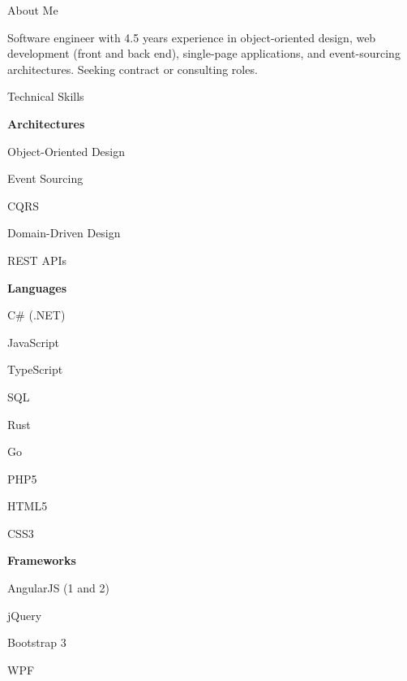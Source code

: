 \documentclass{article}
\begin{document}
    \bigskip\bigskip\bigskip


    {
        \noindent\Large
        About Me
    }

    \noindent\makebox[\linewidth]{\rule{\textwidth}{0.4pt}}
    \medskip

    Software engineer with 4.5 years experience in object-oriented design, web development (front and back end), single-page applications, and event-sourcing architectures. Seeking contract or consulting roles.


    \bigskip\bigskip\bigskip


    {
        \noindent\Large
        Technical Skills
    }

    \noindent\makebox[\linewidth]{\rule{\textwidth}{0.4pt}}
    \medskip


    \begin{multicols}{2}
        \textbf{Architectures}

            \smallskip

            Object-Oriented Design

            Event Sourcing

            CQRS

            Domain-Driven Design

            REST APIs

        \bigskip

        \textbf{Languages}

            \smallskip

            C\# (.NET)
            
            JavaScript 

            TypeScript
            
            SQL

            Rust

            Go

            PHP5

            HTML5

            CSS3

        \columnbreak

        \textbf{Frameworks}

            \smallskip

            AngularJS (1 and 2)

            jQuery

            Bootstrap 3

            WPF 

        \bigskip
            

\end{multicols}
\end{document}
